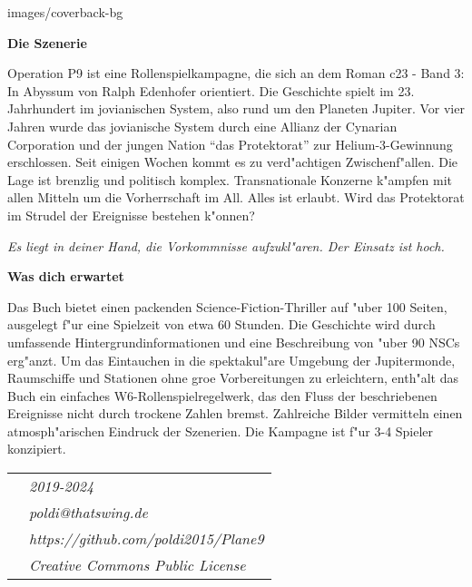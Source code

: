 \begin{backcover}{images/coverback-bg}

    \vspace{5mm}
    \textbf{Die Szenerie}

    Operation P9 ist eine Rollenspielkampagne, die sich an dem Roman c23 - Band 3: In Abyssum von Ralph Edenhofer orientiert. Die Geschichte spielt im 23. Jahrhundert im jovianischen System, also rund um den Planeten Jupiter. Vor vier Jahren wurde das jovianische System durch eine Allianz der Cynarian Corporation und der jungen Nation ``das Protektorat'' zur Helium-3-Gewinnung erschlossen. Seit einigen Wochen kommt es zu verd"achtigen Zwischenf"allen. Die Lage ist brenzlig und politisch komplex. Transnationale Konzerne k"ampfen mit allen Mitteln um die Vorherrschaft im All. Alles ist erlaubt. Wird das Protektorat im Strudel der Ereignisse bestehen k"onnen?

    \medskip
    \emph{Es liegt in deiner Hand, die Vorkommnisse aufzukl"aren. Der Einsatz ist hoch.}

    \vspace{5mm}
    \textbf{Was dich erwartet}

    Das Buch bietet einen packenden Science-Fiction-Thriller auf "uber 100 Seiten, ausgelegt f"ur eine Spielzeit von etwa 60 Stunden. Die Geschichte wird durch umfassende Hintergrundinformationen und eine Beschreibung von "uber 90 NSCs erg"anzt. Um das Eintauchen in die spektakul"are Umgebung der Jupitermonde, Raumschiffe und Stationen ohne gro\3e Vorbereitungen zu erleichtern, enth"alt das Buch ein einfaches W6-Rollenspielregelwerk, das den Fluss der beschriebenen Ereignisse nicht durch trockene Zahlen bremst. Zahlreiche Bilder vermitteln einen atmosph"arischen Eindruck der Szenerien. Die Kampagne ist f"ur 3-4 Spieler konzipiert.

    \vspace{15mm}
    \newcommand{\footerentry}[1]{\textit{\normalsize{}{#1}}}
    \begin{tabularx}{\textwidth} {
        >{\raggedright\arraybackslash}X
        >{\raggedleft\arraybackslash}X
    }
        & \footerentry{2019-2024} \\
        & \footerentry{poldi@thatswing.de}\\
        & \footerentry{https://github.com/poldi2015/Plane9}\\
        & \footerentry{Creative Commons Public License} 
    \end{tabularx}

\end{backcover}
